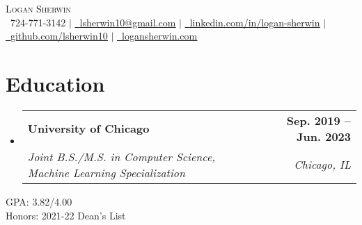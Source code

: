 \documentclass[letterpaper,11pt]{article}
\makeatletter
\newcommand{\resumeSubheading}[4]{
  \vspace{-2pt}\item
    \begin{tabular*}{1.0\textwidth}[t]{l@{\extracolsep{\fill}}r}
      \textbf{#1} & \textbf{\small #2} \\
      \textit{\small#3} & \textit{\small #4} \\
    \end{tabular*}\vspace{-7pt}
}
\newcommand{\resumeSubHeadingListStart}{\begin{itemize}[leftmargin=0.0in, label={}]}
\newcommand{\resumeSubHeadingListEnd}{\end{itemize}}
\makeatother
\begin{document}

\begin{center}
    {\Huge \scshape Logan Sherwin} \\ \vspace{1pt}
    \small \raisebox{-0.1\height}\ 724-771-3142 $|$ \href{mailto:lsherwin10@gmail.com}{\raisebox{-0.2\height}\  \underline{lsherwin10@gmail.com}} $|$ 
    \href{https://linkedin.com/in/logan-sherwin/}{\raisebox{-0.2\height}\ \underline{linkedin.com/in/logan-sherwin}}  $|$
    \href{https://github.com/lsherwin10}{\raisebox{-0.2\height}\ \underline{github.com/lsherwin10}} $|$ \href{https://logansherwin.com/}{\raisebox{-0.2\height}\ \underline{logansherwin.com}}
    \vspace{-8pt}
\end{center}


\section{Education}
  \resumeSubHeadingListStart
    \resumeSubheading
      {University of Chicago}{Sep. 2019 -- Jun. 2023}
      {Joint B.S./M.S. in Computer Science, Machine Learning Specialization}{Chicago, IL}
  \resumeSubHeadingListEnd
  \vspace{-6pt} \small GPA: 3.82/4.00 \\
  \vspace{-1pt} \small Honors: 2021-22 Dean's List \vspace{-8pt}
\end{document}
